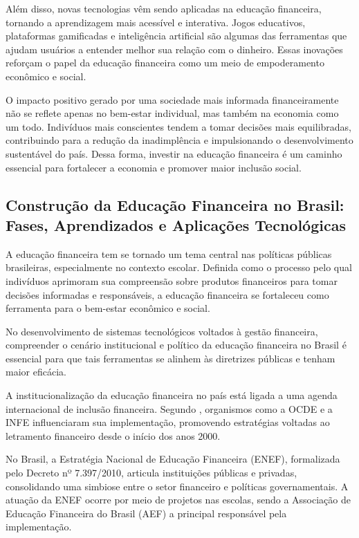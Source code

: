 \documentclass[
	article,			%
	12pt,				%
	oneside,			%
	a4paper,			%
	english,			%
	brazil,				%
	sumario=tradicional
	]{abntex2}
\begin{document}
    Além disso, novas tecnologias vêm sendo aplicadas na educação financeira, tornando a aprendizagem mais acessível e interativa. Jogos educativos, plataformas gamificadas e inteligência artificial são algumas das ferramentas que ajudam usuários a entender melhor sua relação com o dinheiro. Essas inovações reforçam o papel da educação financeira como um meio de empoderamento econômico e social.

    O impacto positivo gerado por uma sociedade mais informada financeiramente não se reflete apenas no bem-estar individual, mas também na economia como um todo. Indivíduos mais conscientes tendem a tomar decisões mais equilibradas, contribuindo para a redução da inadimplência e impulsionando o desenvolvimento sustentável do país. Dessa forma, investir na educação financeira é um caminho essencial para fortalecer a economia e promover maior inclusão social.
    
\subsection{Construção da Educação Financeira no Brasil: Fases, Aprendizados e Aplicações Tecnológicas}
    A educação financeira tem se tornado um tema central nas políticas públicas brasileiras, especialmente no contexto escolar. Definida como o processo pelo qual indivíduos aprimoram sua compreensão sobre produtos financeiros para tomar decisões informadas e responsáveis, a educação financeira se fortaleceu como ferramenta para o bem-estar econômico e social.

    No desenvolvimento de sistemas tecnológicos voltados à gestão financeira, compreender o cenário institucional e político da educação financeira no Brasil é essencial para que tais ferramentas se alinhem às diretrizes públicas e tenham maior eficácia.

    A institucionalização da educação financeira no país está ligada a uma agenda internacional de inclusão financeira. Segundo , organismos como a OCDE e a INFE influenciaram sua implementação, promovendo estratégias voltadas ao letramento financeiro desde o início dos anos 2000.

    No Brasil, a Estratégia Nacional de Educação Financeira (ENEF), formalizada pelo Decreto nº 7.397/2010, articula instituições públicas e privadas, consolidando uma simbiose entre o setor financeiro e políticas governamentais. A atuação da ENEF ocorre por meio de projetos nas escolas, sendo a Associação de Educação Financeira do Brasil (AEF) a principal responsável pela implementação.
\end{document}
